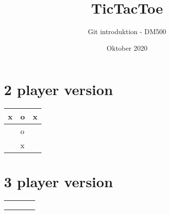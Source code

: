 \documentclass[20pt]{article}
\title{TicTacToe}
\author{Git introduktion - DM500}
\date{Oktober 2020}
\begin{document}
\maketitle

\section*{2 player version}

\setlength{\tabcolsep}{20pt}
\renewcommand{\arraystretch}{4}

\begin{table}[h]
\Large
    \centering
\begin{tabular}{ |m{2cm}|m{2cm}|m{2cm}|}
\hline

 x&o&x   \\ \hline
 &o&   \\ \hline
  &  x &   \\ \hline
\end{tabular}

\end{table}

\newpage

\section*{3 player version}

\setlength{\tabcolsep}{14pt}
\renewcommand{\arraystretch}{5}

\begin{table}[h]
\large
    \centering
\begin{tabular}{ |m{2cm}|m{2cm}|m{2cm}|m{2cm}|}
\hline
  &   &   &   \\ \hline
  &   &   &   \\ \hline
  &   &   &   \\ \hline
  &   &   &   \\ \hline

\end{tabular}

\end{table}
\end{document}
